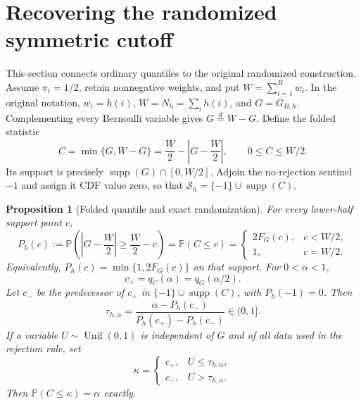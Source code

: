 \documentclass[11pt,letterpaper]{article}
\numberwithin{equation}{section}
\newtheorem{proposition}[theorem]{Proposition}
\theoremstyle{definition}
\theoremstyle{remark}
\begin{document}
\section{Recovering the randomized symmetric cutoff}
\label{sec:randomized}

This section connects ordinary quantiles to the original randomized
construction.  Assume $\pi_i=1/2$, retain nonnegative weights, and put
$W=\sum_{i=1}^B w_i$. In the original notation, $w_i=h(i)$,
$W=N_h=\sum_i h(i)$, and $G=G_{B,h}$.
Complementing every Bernoulli variable gives
$G\overset{d}=W-G$.  Define the folded statistic
\[
 C=\min\{G,W-G\}
   =\frac W2-\left|G-\frac W2\right|,
 \qquad 0\le C\le W/2.
\]
Its support is precisely
$\operatorname{supp}(G)\cap[0,W/2]$.  Adjoin the no-rejection sentinel
$-1$ and assign it CDF value zero, so that
$\mathcal S_h=\{-1\}\cup\operatorname{supp}(C)$.

\begin{proposition}[Folded quantile and exact randomization]
\label{prop:randomized-cutoff}
For every lower-half support point $c$,
\begin{equation}
 P_h(c):=\mathbb P\!\left(
  \left|G-\frac W2\right|\ge\frac W2-c\right)
 =\mathbb P(C\le c)
 =\begin{cases}
   2F_G(c),&c<W/2,\\
   1,&c=W/2.
  \end{cases}
 \label{eq:folded-cdf}
\end{equation}
Equivalently, $P_h(c)=\min\{1,2F_G(c)\}$ on that support.
For $0<\alpha<1$,
\begin{equation}
 c_+=q_C(\alpha)=q_G(\alpha/2).
 \label{eq:folded-ordinary-quantile}
\end{equation}
Let $c_-$ be the predecessor of $c_+$ in
$\{-1\}\cup\operatorname{supp}(C)$, with $P_h(-1)=0$.  Then
\begin{equation}
 \tau_{h,\alpha}
 =\frac{\alpha-P_h(c_-)}{P_h(c_+)-P_h(c_-)}\in(0,1].
 \label{eq:randomized-weight}
\end{equation}
If a variable $U\sim\operatorname{Unif}(0,1)$ is independent of $G$ and
of all data used in the rejection rule, set
\[
 \kappa=\begin{cases}
  c_+,&U\le\tau_{h,\alpha},\\
  c_-,&U>\tau_{h,\alpha}.
 \end{cases}
\]
Then $\mathbb P(C\le\kappa)=\alpha$ exactly.
\end{proposition}
\end{document}
